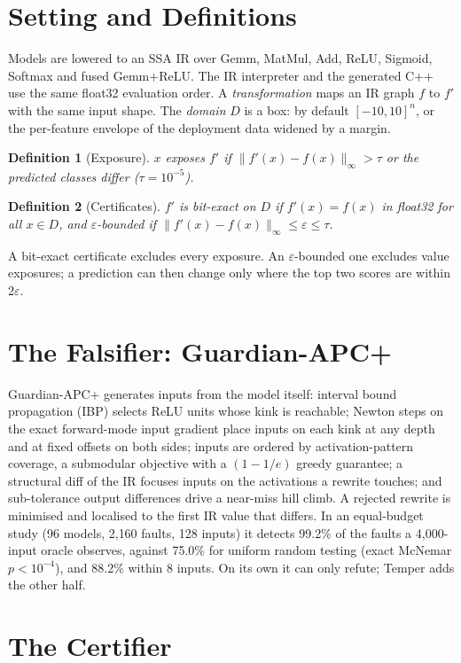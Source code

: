 \documentclass[conference]{IEEEtran}
\newtheorem{definition}{Definition}
\begin{document}
\section{Setting and Definitions}\label{sec:setting}
Models are lowered to an SSA IR over Gemm, MatMul, Add, ReLU, Sigmoid, Softmax and fused Gemm+ReLU. The IR interpreter and the generated C++ use the same float32 evaluation order. A \emph{transformation} maps an IR graph $f$ to $f'$ with the same input shape. The \emph{domain} $D$ is a box: by default $[-10,10]^n$, or the per-feature envelope of the deployment data widened by a margin.

\begin{definition}[Exposure]
$x$ exposes $f'$ if $\|f'(x)-f(x)\|_\infty>\tau$ or the predicted classes differ ($\tau=10^{-5}$).
\end{definition}
\begin{definition}[Certificates]
$f'$ is \emph{bit-exact} on $D$ if $f'(x)=f(x)$ in float32 for all $x\in D$, and \emph{$\varepsilon$-bounded} if $\|f'(x)-f(x)\|_\infty\le\varepsilon\le\tau$.
\end{definition}
A bit-exact certificate excludes every exposure. An $\varepsilon$-bounded one excludes value exposures; a prediction can then change only where the top two scores are within $2\varepsilon$.

\section{The Falsifier: Guardian-APC+}\label{sec:falsifier}
Guardian-APC+ generates inputs from the model itself: interval bound propagation (IBP) selects ReLU units whose kink is reachable; Newton steps on the exact forward-mode input gradient place inputs on each kink at any depth and at fixed offsets on both sides; inputs are ordered by activation-pattern coverage, a submodular objective with a $(1-1/e)$ greedy guarantee; a structural diff of the IR focuses inputs on the activations a rewrite touches; and sub-tolerance output differences drive a near-miss hill climb. A rejected rewrite is minimised and localised to the first IR value that differs. In an equal-budget study (96 models, 2{,}160 faults, 128 inputs) it detects 99.2\% of the faults a 4{,}000-input oracle observes, against 75.0\% for uniform random testing (exact McNemar $p<10^{-4}$), and 88.2\% within 8 inputs. On its own it can only refute; Temper adds the other half.

\section{The Certifier}\label{sec:certifier}
\end{document}
